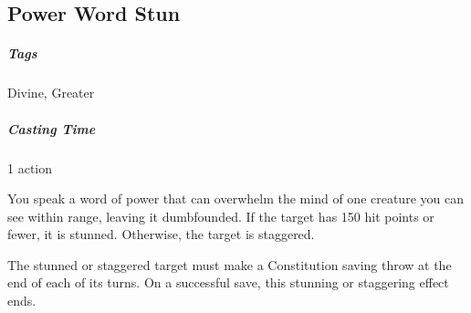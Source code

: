 \subsection{Power Word Stun}
\subparagraph*{Tags} Divine, Greater
\subparagraph*{Casting Time} 1 action

You speak a word of power that can overwhelm the mind of one creature you can see within range, leaving it dumbfounded. If the target has 150 hit points or fewer, it is stunned. Otherwise, the target is staggered.

The stunned or staggered target must make a Constitution saving throw at the end of each of its turns. On a successful save, this stunning or staggering effect ends.









